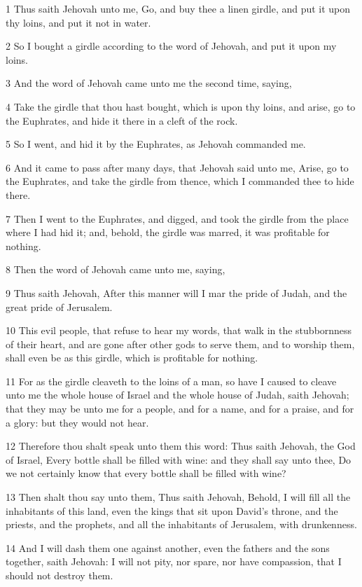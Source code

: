 \par 1 Thus saith Jehovah unto me, Go, and buy thee a linen girdle, and put it upon thy loins, and put it not in water.
\par 2 So I bought a girdle according to the word of Jehovah, and put it upon my loins.
\par 3 And the word of Jehovah came unto me the second time, saying,
\par 4 Take the girdle that thou hast bought, which is upon thy loins, and arise, go to the Euphrates, and hide it there in a cleft of the rock.
\par 5 So I went, and hid it by the Euphrates, as Jehovah commanded me.
\par 6 And it came to pass after many days, that Jehovah said unto me, Arise, go to the Euphrates, and take the girdle from thence, which I commanded thee to hide there.
\par 7 Then I went to the Euphrates, and digged, and took the girdle from the place where I had hid it; and, behold, the girdle was marred, it was profitable for nothing.
\par 8 Then the word of Jehovah came unto me, saying,
\par 9 Thus saith Jehovah, After this manner will I mar the pride of Judah, and the great pride of Jerusalem.
\par 10 This evil people, that refuse to hear my words, that walk in the stubbornness of their heart, and are gone after other gods to serve them, and to worship them, shall even be as this girdle, which is profitable for nothing.
\par 11 For as the girdle cleaveth to the loins of a man, so have I caused to cleave unto me the whole house of Israel and the whole house of Judah, saith Jehovah; that they may be unto me for a people, and for a name, and for a praise, and for a glory: but they would not hear.
\par 12 Therefore thou shalt speak unto them this word: Thus saith Jehovah, the God of Israel, Every bottle shall be filled with wine: and they shall say unto thee, Do we not certainly know that every bottle shall be filled with wine?
\par 13 Then shalt thou say unto them, Thus saith Jehovah, Behold, I will fill all the inhabitants of this land, even the kings that sit upon David's throne, and the priests, and the prophets, and all the inhabitants of Jerusalem, with drunkenness.
\par 14 And I will dash them one against another, even the fathers and the sons together, saith Jehovah: I will not pity, nor spare, nor have compassion, that I should not destroy them.
